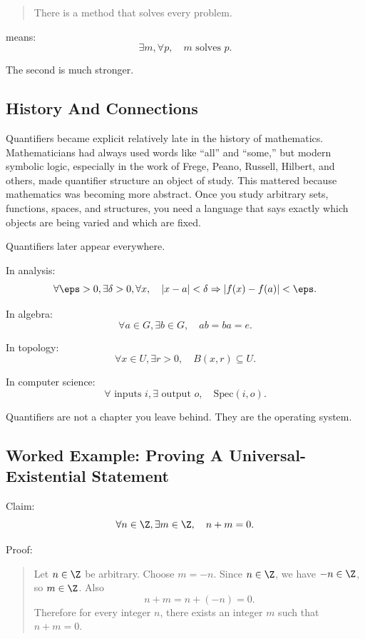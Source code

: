 \begin{quote}
There is a method that solves every problem.
\end{quote}

means:
\[
\exists m,\forall p,\quad m\text{ solves }p.
\]

The second is much stronger.

\subsection{History And Connections}

\begin{historybox}
Quantifiers became explicit relatively late in the history of mathematics. Mathematicians had always used words like ``all'' and ``some,'' but modern symbolic logic, especially in the work of Frege, Peano, Russell, Hilbert, and others, made quantifier structure an object of study. This mattered because mathematics was becoming more abstract. Once you study arbitrary sets, functions, spaces, and structures, you need a language that says exactly which objects are being varied and which are fixed.
\end{historybox}

Quantifiers later appear everywhere.

In analysis:
\[
\forall \eps>0,\exists \delta>0,\forall x,\quad |x-a|<\delta\Rightarrow |f(x)-f(a)|<\eps.
\]

In algebra:
\[
\forall a\in G,\exists b\in G,\quad ab=ba=e.
\]

In topology:
\[
\forall x\in U,\exists r>0,\quad B(x,r)\subseteq U.
\]

In computer science:
\[
\forall \text{ inputs }i,\exists \text{ output }o,\quad \text{Spec}(i,o).
\]

Quantifiers are not a chapter you leave behind. They are the operating system.

\subsection{Worked Example: Proving A Universal-Existential Statement}

Claim:
\[
\forall n\in\Z,\exists m\in\Z,\quad n+m=0.
\]

Proof:

\begin{quote}
Let $n\in\Z$ be arbitrary. Choose $m=-n$. Since $n\in\Z$, we have $-n\in\Z$, so $m\in\Z$. Also
\[
n+m=n+(-n)=0.
\]
Therefore for every integer $n$, there exists an integer $m$ such that $n+m=0$.
\end{quote}

